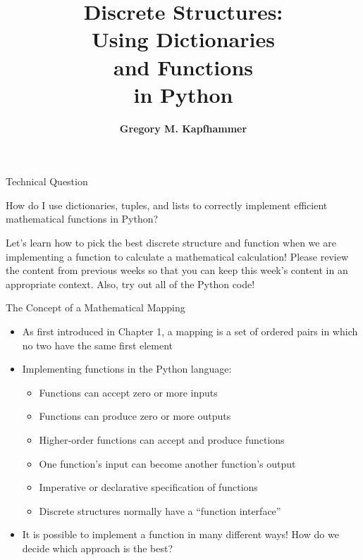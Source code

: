 \documentclass[14pt,aspectratio=169]{beamer}
\title{\vspace*{-.25in}Discrete Structures: \\ Using Dictionaries \\ and Functions \\ in Python}
\author{{\bf Gregory M. Kapfhammer}}
\institute[shortinst]{{\bf Department of Computer Science, Allegheny College}}
\begin{document}
{
  \begin{frame}
    \titlepage
  \end{frame}
}

%
\begin{frame}{Technical Question}
  \hspace*{.5in}
  \begin{minipage}{4.3in}
    \vspace*{.1in}
    \begin{center}
      {\large How do I use dictionaries, tuples, and lists to correctly
      implement efficient mathematical functions in Python?}
    \end{center}
  \end{minipage}
  \vspace{2ex}
  \begin{center}
    \small Let's learn how to pick the best discrete structure and function when
    we are implementing a function to calculate a mathematical calculation!
    Please review the content from previous weeks so that you can keep this
    week's content in an appropriate context. Also, try out all of the Python
    code!
  \end{center}
\end{frame}

%
\begin{frame}{The Concept of a Mathematical Mapping}
  \begin{itemize}
    \item As first introduced in Chapter 1, a mapping is a set of ordered pairs
      in which no two have the same first element
      \vspace*{-.15in}
    \item Implementing functions in the Python language:
      \begin{itemize}
        \item Functions can accept zero or more inputs
        \item Functions can produce zero or more outputs
        \item Higher-order functions can accept and produce functions
        \item One function's input can become another function's output
        \item Imperative or declarative specification of functions
        \item Discrete structures normally have a ``function interface''
      \end{itemize}
      \vspace*{-.2in}
    \item It is possible to implement a function in many different ways! How do
      we decide which approach is the best?
  \end{itemize}
\end{frame}
\end{document}
